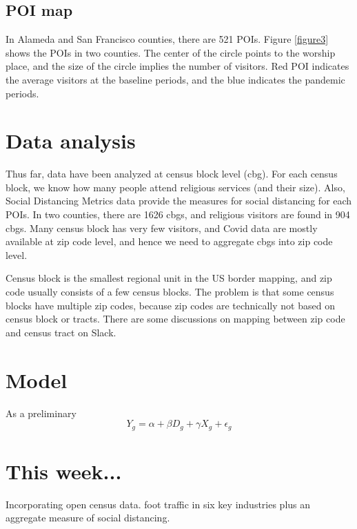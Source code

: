 \documentclass[12pt,english]{article}
\begin{document}
\subsection{POI map}
In Alameda and San Francisco counties, there are 521 POIs. Figure \ref{figure3} shows the POIs in two counties.  The center of the circle points to the worship place, and the size of the circle implies the number of visitors. Red POI indicates the average visitors at the baseline periods, and the blue indicates the pandemic periods. 


\section{Data analysis}
Thus far, data have been analyzed at census block level (cbg). For each census block, we know how many people attend religious services (and their size). Also, Social Distancing Metrics data provide the measures for social distancing for each POIs. In two counties, there are 1626 cbgs, and religious visitors are found in 904 cbgs. Many census block has very few visitors, and Covid data are mostly available at zip code level, and hence we need to aggregate cbgs into zip code level. 

Census block is the smallest regional unit in the US border mapping, and zip code usually consists of a few census blocks. The problem is that some census blocks have multiple zip codes, because zip codes are technically not based on census block or tracts. There are some discussions on mapping between zip code and census tract on Slack. 

\section{Model}
As a preliminary
\[
Y_g = \alpha + \beta D_g + \gamma X_g + \epsilon_g 
\]


\section{This week...}
Incorporating open census data.
foot traffic in six key industries plus an aggregate measure of social distancing.
\end{document}
